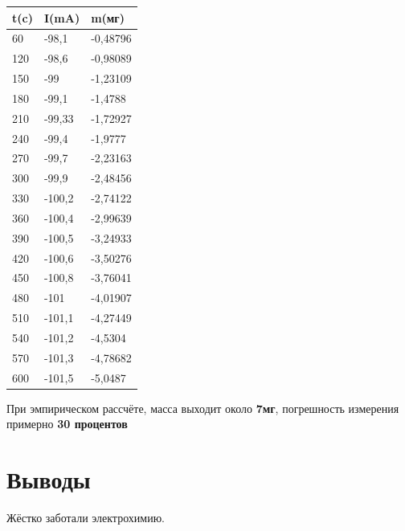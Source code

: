 \documentclass[a4paper,12pt]{article}
\begin{document}
\begin{table}[H]    
\centering
    \begin{tabular}{|l|l|l|}
    \hline
    t(c) & I(mA) & m(мг) \\ \hline 
        60 & -98,1 & -0,48796 \\ \hline       
        120 & -98,6 & -0,98089 \\ \hline
        150 & -99 & -1,23109 \\ \hline       
        180 & -99,1 & -1,4788 \\ \hline
        210 & -99,33 & -1,72927 \\ \hline        
        240 & -99,4 & -1,9777 \\ \hline
        270 & -99,7 & -2,23163 \\ \hline        
        300 & -99,9 & -2,48456 \\ \hline
        330 & -100,2 & -2,74122 \\ \hline        
        360 & -100,4 & -2,99639 \\ \hline
        390 & -100,5 & -3,24933 \\ \hline        
        420 & -100,6 & -3,50276 \\ \hline
        450 & -100,8 & -3,76041 \\ \hline        
        480 & -101 & -4,01907 \\ \hline
        510 & -101,1 & -4,27449 \\ \hline        
        540 & -101,2 & -4,5304 \\ \hline
        570 & -101,3 & -4,78682 \\ \hline        
        600 & -101,5 & -5,0487 \\ \hline
    \end{tabular}
    \end{table}

    
    При эмпирическом рассчёте, масса выходит около \textbf{7мг}, погрешность измерения примерно \textbf{30 процентов}
    \section{Выводы}
    Жёстко заботали электрохимию.
\end{document}

